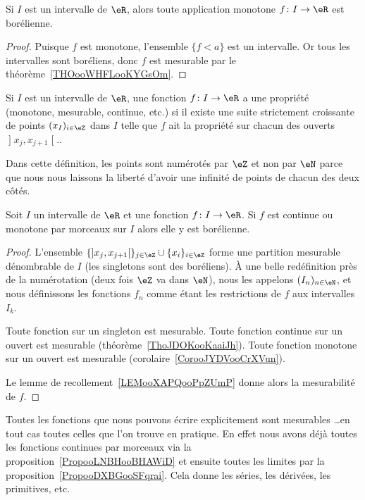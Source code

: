 \begin{corollary}       \label{CorooJYDVooCrXVun}
    Si \( I\) est un intervalle de \( \eR\), alors toute application monotone \( f\colon I\to \eR\) est borélienne.
\end{corollary}

\begin{proof}
    Puisque \( f\) est monotone, l'ensemble \( \{ f<a \}\) est un intervalle. Or tous les intervalles sont boréliens, donc \( f\) est mesurable par le théorème~\ref{THOooWHFLooKYGsOm}.
\end{proof}

\begin{definition}
    Si \( I\) est un intervalle de \( \eR\), une fonction \( f\colon I\to \eR\) a une propriété (monotone, mesurable, continue, etc.)  si il existe une suite strictement croissante de points \( (x_I)_{i\in \eZ}\) dans \( I\) telle que \( f\) ait la propriété sur chacun des ouverts \( \mathopen] x_j ,x_{j+1} \mathclose[.\).
\end{definition}
Dans cette définition, les points sont numérotés par \( \eZ\) et non par \( \eN\) parce que nous nous laissons la liberté d'avoir une infinité de points de chacun des deux côtés.

\begin{proposition}     \label{PropooLNBHooBHAWiD}
    Soit \( I\) un intervalle de \( \eR\) et une fonction \( f\colon I\to \eR\). Si \( f\) est continue ou monotone par morceaux sur \( I\) alors elle y est borélienne.
\end{proposition}

\begin{proof}
    L'ensemble \( \{  \mathopen] x_j , x_{j+1} \mathclose[  \}_{j\in \eZ}\cup\{ x_i \}_{i\in \eZ}\) forme une partition mesurable dénombrable de \( I\) (les singletons sont des boréliens). À une belle redéfinition près de la numérotation (deux fois \( \eZ\) va dans \( \eN\)), nous les appelons \( (I_n)_{n\in \eN}\), et nous définissons les fonctions \( f_n\) comme étant les restrictions de \( f\) aux intervalles \( I_k\).

    Toute fonction sur un singleton est mesurable. Toute fonction continue sur un ouvert est mesurable (théorème~\ref{ThoJDOKooKaaiJh}). Toute fonction monotone sur un ouvert est mesurable (corolaire~\ref{CorooJYDVooCrXVun}).

    Le lemme de recollement~\ref{LEMooXAPQooPpZUmP} donne alors la mesurabilité de \( f\).
\end{proof}

\begin{normaltext}
    Toutes les fonctions que nous pouvons écrire explicitement sont mesurables \ldots en tout cas toutes celles que l'on trouve en pratique. En effet nous avons déjà toutes les fonctions continues par morceaux via la proposition~\ref{PropooLNBHooBHAWiD} et ensuite toutes les limites par la proposition~\ref{PropooDXBGooSFqrai}. Cela donne les séries, les dérivées, les primitives, etc.
\end{normaltext}
